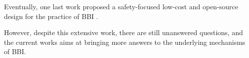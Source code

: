 		Eventually, one last work proposed a safety-focused low-cost and open-source design for the practice of BBI \cite{colinFdtc2023}.

		However, despite this extensive work, there are still unanswered questions, and the current works aims at bringing more answers to the underlying mechanisms of BBI.


%
%		
%


